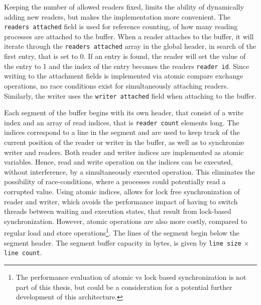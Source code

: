 Keeping the number of allowed readers fixed, limits the ability of dynamically adding new readers, but makes the implementation more convenient. The \texttt{readers attached} field is used for
reference counting, of how many reading processes are attached to the buffer. When a reader attaches to the buffer, it will iterate through the \texttt{readers attached} array in the global header, in search of the first entry, that is
set to 0. If an entry is found, the reader will set the value of the entry to 1 and the index of the entry becomes the readers \texttt{reader id}. Since writing to the attachment fields 
is implemented via atomic compare exchange operations, no race conditions exist for simultaneously attaching readers. Similarly, the writer uses the \texttt{writer attached} field when attaching to the buffer.
\par
Each segment of the buffer begins with its own header, that consist of a write index and an array of read indices, that is \texttt{reader count} elements long.
The indices correspond to a line in the segment and are used to keep track of the current position of the reader or writer in the buffer, as well
as to synchronize writer and readers. Both reader and writer indices are implemented as atomic variables. Hence, read and write operation 
on the indices can be executed, without interference, by a simultaneously executed operation. This eliminates the possibility of race-conditions, where a processes could potentially read a corrupted value. Using atomic indices, allows for lock free synchronization of reader and writer, which avoids the performance impact of having to
switch threads between waiting and execution states, that result from lock-based synchronization. However, atomic operations are also more costly, compared to regular load and store operations\footnote{The performance evaluation of atomic vs lock based synchronization is not part of this thesis, but could be a consideration for a potential further development of this architecture.}. 
The lines of the segment begin below the segment header. The segment buffer capacity in bytes, is given by \texttt{line size} $\times$ \texttt{line count}.  

